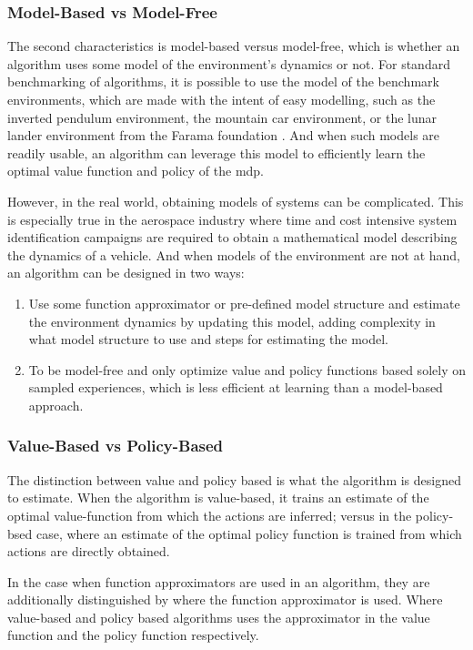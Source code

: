 \documentclass[../report.tex]{subfiles}
\begin{document}
\subsubsection{Model-Based vs Model-Free}

The second characteristics is model-based versus model-free, which is whether an algorithm uses some model of the environment's dynamics or not. For standard benchmarking of algorithms, it is possible to use the model of the benchmark environments, which are made with the intent of easy modelling, such as the inverted pendulum environment, the mountain car environment, or the lunar lander environment from the Farama foundation \cite{towers_gymnasium_2023}. And when such models are readily usable, an algorithm can leverage this model to efficiently learn the optimal value function and policy of the \ac{mdp}. 

However, in the real world, obtaining models of systems can be complicated. This is especially true in the aerospace industry where time and cost intensive system identification campaigns are required to obtain a mathematical model describing the dynamics of a vehicle. And when models of the environment are not at hand, an algorithm can be designed in two ways:

\begin{enumerate}
    \item Use some function approximator or pre-defined model structure and estimate the environment dynamics by updating this model, adding complexity in what model structure to use and steps for estimating the model.
    \item To be model-free and only optimize value and policy functions based solely on sampled experiences, which is less efficient at learning than a model-based approach.
\end{enumerate}

\subsubsection{Value-Based vs Policy-Based}

The distinction between value and policy based is what the algorithm is designed to estimate. When the algorithm is value-based, it trains an estimate of the optimal value-function from which the actions are inferred; versus in the policy-bsed case, where an estimate of the optimal policy function is trained from which actions are directly obtained.

In the case when function approximators are used in an algorithm, they are additionally distinguished by where the function approximator is used. Where value-based and policy based algorithms uses the approximator in the value function and the policy function respectively.
\end{document}
